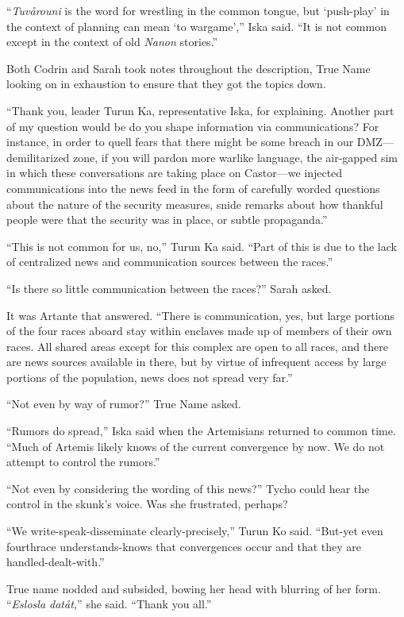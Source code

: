 ``\emph{Tuvårouni} is the word for wrestling in the common tongue, but `push-play' in the context of planning can mean `to wargame','' Iska said. ``It is not common except in the context of old \emph{Nanon} stories.''

Both Codrin and Sarah took notes throughout the description, True Name looking on in exhaustion to ensure that they got the topics down.

``Thank you, leader Turun Ka, representative Iska, for explaining. Another part of my question would be do you shape information via communications? For instance, in order to quell fears that there might be some breach in our DMZ—demilitarized zone, if you will pardon more warlike language, the air-gapped sim in which these conversations are taking place on Castor—we injected communications into the news feed in the form of carefully worded questions about the nature of the security measures, snide remarks about how thankful people were that the security was in place, or subtle propaganda.''

``This is not common for us, no,'' Turun Ka said. ``Part of this is due to the lack of centralized news and communication sources between the races.''

``Is there so little communication between the races?'' Sarah asked.

It was Artante that answered. ``There is communication, yes, but large portions of the four races aboard stay within enclaves made up of members of their own races. All shared areas except for this complex are open to all races, and there are news sources available in there, but by virtue of infrequent access by large portions of the population, news does not spread very far.''

``Not even by way of rumor?'' True Name asked.

``Rumors do spread,'' Iska said when the Artemisians returned to common time. ``Much of Artemis likely knows of the current convergence by now. We do not attempt to control the rumors.''

``Not even by considering the wording of this news?'' Tycho could hear the control in the skunk's voice. Was she frustrated, perhaps?

``We write-speak-disseminate clearly-precisely,'' Turun Ko said. ``But-yet even fourthrace understands-knows that convergences occur and that they are handled-dealt-with.''

True name nodded and subsided, bowing her head with blurring of her form. ``\emph{Eslosla datåt,}'' she said. ``Thank you all.''


